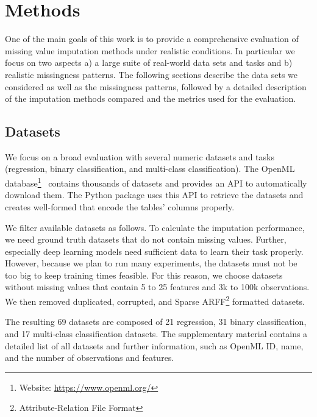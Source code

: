 
\section{Methods}
\label{sec:methods}
%
One of the main goals of this work is to provide a comprehensive evaluation of missing value imputation methods under realistic conditions. In particular we focus on two aspects a) a large suite of real-world data sets and tasks and b) realistic missingness patterns. The following sections describe the data sets we considered as well as the missingness patterns, followed by a detailed description of the imputation methods compared and the metrics used for the evaluation.

\subsection{Datasets}
\label{sec:datasets}
%
We focus on a broad evaluation with several numeric datasets and tasks (regression, binary classification, and multi-class classification). The OpenML database\footnote{Website: \url{https://www.openml.org/}}~\citep{OpenML2013} contains thousands of datasets and provides an API to automatically download them. The Python package  \citep{scikit-learn} uses this API to retrieve the datasets and creates well-formed  that encode the tables' columns properly.

We filter available datasets as follows. To calculate the imputation performance, we need ground truth datasets that do not contain missing values. Further, especially deep learning models need sufficient data to learn their task properly. However, because we plan to run many experiments, the datasets must not be too big to keep training times feasible. For this reason, we choose datasets without missing values that contain 5 to 25 features and 3k to 100k observations. We then removed duplicated, corrupted, and Sparse ARFF\footnote{Attribute-Relation File Format} formatted datasets.

The resulting 69 datasets are composed of 21 regression, 31 binary classification, and 17 multi-class classification datasets. The supplementary material contains a detailed list of all datasets and further information, such as OpenML ID, name, and the number of observations and features.


